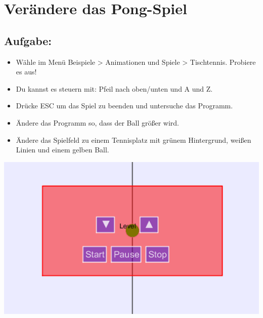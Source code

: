 \chapter{Verändere das Pong-Spiel}
\begin{multicols}{2}
\section*{\color{BrickRed}Aufgabe:}


\begin{itemize}

\item {Wähle im Menü Beispiele > Animationen und Spiele > Tischtennis. Probiere es aus!}
\item {Du kannst es steuern mit: Pfeil nach oben/unten und A und Z.}
\item {Drücke ESC um das Spiel zu beenden und untersuche das Programm.}
\item {Ändere das Programm so, dass der Ball größer wird.}
\item {Ändere das Spielfeld zu einem Tennisplatz mit grünem Hintergrund, weißen Linien und einem gelben Ball.}

\end{itemize}



\columnbreak

\begin{center}
\includegraphics{../img/pong.png}
\end{center}

\end{multicols}

